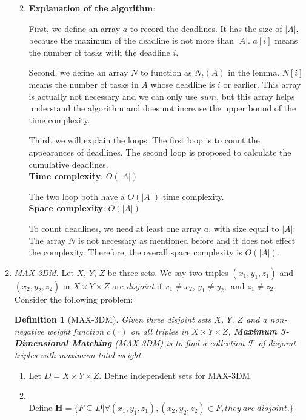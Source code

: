\documentclass[12pt,a4paper]{article}
\makeatletter
\newtheorem*{solution}{Solution}
\newtheorem{definition}{Definition}
\theoremstyle{definition}
\renewenvironment{solution}[1][Solution] {\par\pushQED{\qed}\normalfont\topsep6\p@\@plus6\p@\relax\trivlist\item[\hskip\labelsep\bfseries#1\@addpunct{.}]\ignorespaces}{\popQED\endtrivlist\@endpefalse} \makeatother
\makeatother
\begin{document}
\begin{enumerate}
\begin{enumerate}
\begin{solution}
\textbf{Explanation of the algorithm}: 

First, we define an array $a$ to record the deadlines. It has the size of $|A|$, because the maximum of the deadline is not more than $|A|$. $a[i]$ means the number of tasks with the deadline $i$. 

Second, we define an array $N$ to function as $N_t(A)$ in the lemma. $N[i]$ means the number of tasks in $A$ whose deadline is $i$ or earlier. This array is actually not necessary and we can only use $sum$, but this array helps understand the algorithm and does not increase the upper bound of the time complexity.

Third, we will explain the loops. The first loop is to count the appearances of deadlines. The second loop is proposed to calculate the cumulative deadlines. 
~\\

\textbf{Time complexity}: $O(|A|)$

The two loop both have a $O(|A|)$ time complexity.
~\\

\textbf{Space complexity}: $O(|A|)$

To count deadlines, we need at least one array $a$, with size equal to $|A|$. The array $N$ is not necessary as mentioned before and it does not effect the complexity. Therefore, the overall space complexity is $O(|A|)$.

            \end{solution}
    \end{enumerate}
\item \textit{MAX-3DM.} Let $X$, $Y$, $Z$ be three sets. We say two triples $\left(x_{1}, y_{1}, z_{1}\right)$ and $\left(x_{2}, y_{2}, z_{2}\right)$ in $X \times Y \times Z$ are \textit{disjoint} if $x_{1} \neq x_{2}$, $y_{1} \neq y_{2},$ and $z_{1} \neq z_{2}$. Consider the following problem:
    
    \begin{definition}[MAX-3DM] 
        Given three disjoint sets $X$, $Y$, $Z$ and a non-negative weight function $c(\cdot)$ on all triples in $X \times Y \times Z$, \textbf{Maximum 3-Dimensional Matching} (MAX-3DM) is to find a collection $\mathcal{F}$ of disjoint triples with maximum total weight.
    \end{definition}

    \begin{enumerate}
    	\item Let $D = X \times Y \times Z$. Define independent sets for MAX-3DM.
	 \begin{solution}
	 ~\\
	    Define $\mathbf{H}=\{F\subseteq D| \forall (x_1,y_1,z_1), (x_2,y_2,z_2)\in F, they\ are\ disjoint.\}$
	    

\end{solution}
\end{enumerate}
\end{enumerate}
\end{document}
